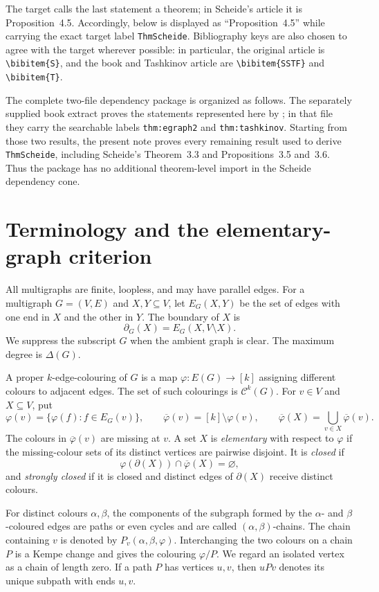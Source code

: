 \documentclass[11pt]{article}
\theoremstyle{definition}
\newcommand{\Ccal}{\mathcal C}
\newcommand{\set}[1]{\{#1\}}
\newcommand{\comp}{\mathbin{\setminus}}
\newcommand{\target}[1]{\texttt{#1}}
\newcommand{\colset}{[k]}
\begin{document}
The target calls the last statement a theorem; in Scheide's article it is
Proposition~4.5. Accordingly,  below is displayed as
``Proposition~4.5'' while carrying the exact target label
\target{ThmScheide}. Bibliography keys are also chosen to agree with the
target wherever possible: in particular, the original article is
\verb|\bibitem{S}|, and the book and Tashkinov article are
\verb|\bibitem{SSTF}| and \verb|\bibitem{T}|.

The complete two-file dependency package is organized as follows. The
separately supplied book extract proves the statements represented here by
; in that file they carry the searchable labels
\texttt{thm:egraph2} and \texttt{thm:tashkinov}. Starting from those two
results, the present note proves every remaining result used to derive
\target{ThmScheide}, including Scheide's Theorem~3.3 and Propositions~3.5
and~3.6. Thus the package has no additional theorem-level import in the
Scheide dependency cone.

\setcounter{section}{1}
\section{Terminology and the elementary-graph criterion}

All multigraphs are finite, loopless, and may have parallel edges. For a
multigraph $G=(V,E)$ and $X,Y\subseteq V$, let $E_G(X,Y)$ be the set of edges
with one end in $X$ and the other in $Y$. The boundary of $X$ is
\[
  \partial_G(X)=E_G(X,V\comp X).
\]
We suppress the subscript $G$ when the ambient graph is clear. The maximum
degree is $\Delta(G)$.

A proper $k$-edge-colouring of $G$ is a map $\varphi:E(G)\to\colset$ assigning
different colours to adjacent edges. The set of such colourings is
$\Ccal^k(G)$. For $v\in V$ and $X\subseteq V$, put
\[
 \varphi(v)=\set{\varphi(f):f\in E_G(v)},\qquad
 \overline\varphi(v)=\colset\comp\varphi(v),\qquad
 \overline\varphi(X)=\bigcup_{v\in X}\overline\varphi(v).
\]
The colours in $\overline\varphi(v)$ are missing at $v$. A set $X$ is
\emph{elementary} with respect to $\varphi$ if the missing-colour sets of its
distinct vertices are pairwise disjoint. It is \emph{closed} if
\[
 \varphi(\partial(X))\cap\overline\varphi(X)=\varnothing,
\]
and \emph{strongly closed} if it is closed and distinct edges of
$\partial(X)$ receive distinct colours.

For distinct colours $\alpha,\beta$, the components of the subgraph formed by
the $\alpha$- and $\beta$-coloured edges are paths or even cycles and are
called $(\alpha,\beta)$-chains. The chain containing $v$ is denoted by
$P_v(\alpha,\beta,\varphi)$. Interchanging the two colours on a chain $P$
is a Kempe change and gives the colouring $\varphi/P$. We regard an isolated
vertex as a chain of length zero. If a path $P$ has vertices $u,v$, then
$uPv$ denotes its unique subpath with ends $u,v$.
\end{document}
